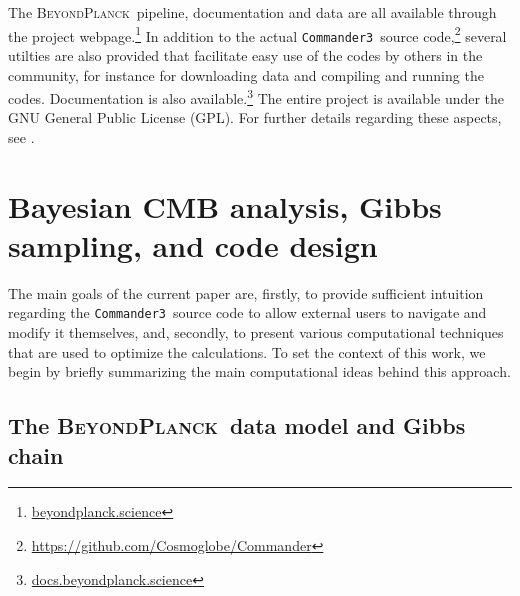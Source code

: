 \documentclass[twocolumn]{aa}
\def\commanderthree{\texttt{Commander3}}
\newcommand{\BP}{\textsc{BeyondPlanck}}
\begin{document}
The \BP\ pipeline, documentation and data are all available through
the project webpage.\footnote{\url{beyondplanck.science}} In addition
to the actual \commanderthree\ source
code,\footnote{\url{https://github.com/Cosmoglobe/Commander}} several
utilties are also provided that facilitate easy use of the codes by
others in the community, for instance for downloading data and
compiling and running the codes. Documentation is also
available.\footnote{\url{docs.beyondplanck.science}} The entire
project is available under the GNU General Public License (GPL).  For
further details regarding these aspects, see \citet{BP05}.

\section{Bayesian CMB analysis, Gibbs sampling, and code design}
\label{sec:gibbs}

The main goals of the current paper are, firstly, to provide sufficient
intuition regarding the \commanderthree\ source code to allow external
users to navigate and modify it themselves, and, secondly, to present
various computational techniques that are used to optimize the
calculations. To set the context of this work, we begin by briefly
summarizing the main computational ideas behind this approach.

\subsection{The \BP\ data model and Gibbs chain}
\label{sec:bp}
\end{document}
